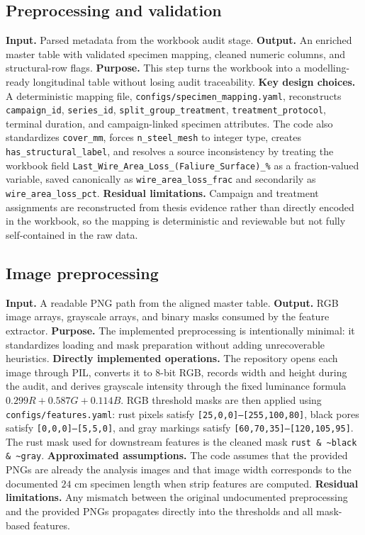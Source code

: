 \documentclass[10pt,a4paper,twocolumn]{article}
\begin{document}
\subsection{Preprocessing and validation}

\textbf{Input.} Parsed metadata from the workbook audit stage. \textbf{Output.} An enriched master table with validated specimen mapping, cleaned numeric columns, and structural-row flags. \textbf{Purpose.} This step turns the workbook into a modelling-ready longitudinal table without losing audit traceability. \textbf{Key design choices.} A deterministic mapping file, \texttt{configs/specimen\_mapping.yaml}, reconstructs \texttt{campaign\_id}, \texttt{series\_id}, \texttt{split\_group\_treatment}, \texttt{treatment\_protocol}, terminal duration, and campaign-linked specimen attributes. The code also standardizes \texttt{cover\_mm}, forces \texttt{n\_steel\_mesh} to integer type, creates \texttt{has\_structural\_label}, and resolves a source inconsistency by treating the workbook field \texttt{Last\_Wire\_Area\_Loss\_(Faliure\_Surface)\_\%} as a fraction-valued variable, saved canonically as \texttt{wire\_area\_loss\_frac} and secondarily as \texttt{wire\_area\_loss\_pct}. \textbf{Residual limitations.} Campaign and treatment assignments are reconstructed from thesis evidence rather than directly encoded in the workbook, so the mapping is deterministic and reviewable but not fully self-contained in the raw data.

\subsection{Image preprocessing}

\textbf{Input.} A readable PNG path from the aligned master table. \textbf{Output.} RGB image arrays, grayscale arrays, and binary masks consumed by the feature extractor. \textbf{Purpose.} The implemented preprocessing is intentionally minimal: it standardizes loading and mask preparation without adding unrecoverable heuristics. \textbf{Directly implemented operations.} The repository opens each image through PIL, converts it to 8-bit RGB, records width and height during the audit, and derives grayscale intensity through the fixed luminance formula $0.299R + 0.587G + 0.114B$. RGB threshold masks are then applied using \texttt{configs/features.yaml}: rust pixels satisfy \texttt{[25,0,0]--[255,100,80]}, black pores satisfy \texttt{[0,0,0]--[5,5,0]}, and gray markings satisfy \texttt{[60,70,35]--[120,105,95]}. The rust mask used for downstream features is the cleaned mask \texttt{rust \& \textasciitilde black \& \textasciitilde gray}. \textbf{Approximated assumptions.} The code assumes that the provided PNGs are already the analysis images and that image width corresponds to the documented $24$ cm specimen length when strip features are computed.  \textbf{Residual limitations.} Any mismatch between the original undocumented preprocessing and the provided PNGs propagates directly into the thresholds and all mask-based features.
\end{document}
